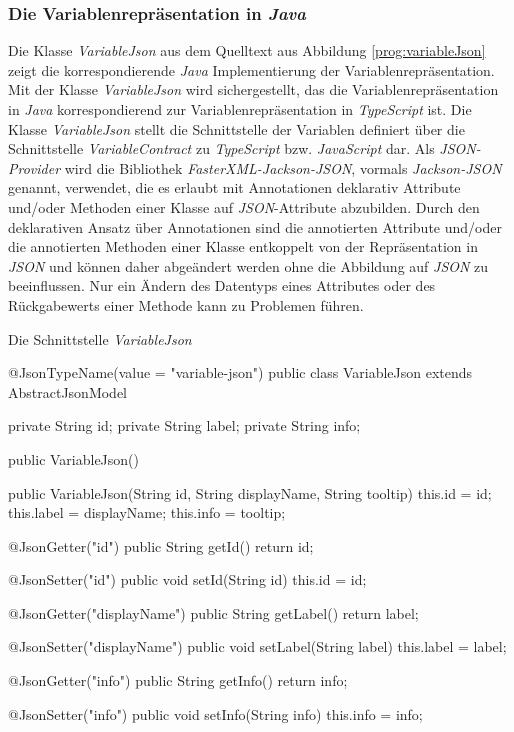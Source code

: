 \subsubsection{Die Variablenrepräsentation in \emph{Java}}
Die Klasse \emph{VariableJson} aus dem Quelltext aus Abbildung \ref{prog:variableJson} zeigt die korrespondierende \emph{Java} Implementierung der Variablenrepräsentation. Mit der Klasse \emph{VariableJson} wird sichergestellt, das die Variablenrepräsentation in \emph{Java} korrespondierend zur Variablenrepräsentation in \emph{TypeScript} ist. Die Klasse \emph{VariableJson} stellt die Schnittstelle der Variablen definiert über die Schnittstelle \emph{VariableContract} zu \emph{TypeScript} bzw. \emph{JavaScript} dar. Als \emph{JSON-Provider} wird die Bibliothek \emph{FasterXML-Jackson-JSON}, vormals \emph{Jackson-JSON} genannt, verwendet, die es erlaubt mit Annotationen deklarativ Attribute und/oder Methoden einer Klasse auf \emph{JSON}-Attribute abzubilden. Durch den deklarativen Ansatz über Annotationen sind die annotierten  Attribute und/oder die annotierten Methoden einer Klasse entkoppelt von der Repräsentation in \emph{JSON} und können daher abgeändert werden ohne die Abbildung auf \emph{JSON} zu beeinflussen. Nur ein Ändern des Datentyps eines Attributes oder des Rückgabewerts einer Methode kann zu Problemen führen. 
\newline
\begin{program}
\caption{Die Schnittstelle \emph{VariableJson}}
\label{prog:variableJson}
\begin{JsCode}
@JsonTypeName(value = "variable-json")
public class VariableJson extends AbstractJsonModel {

    private String id;
    private String label;
    private String info;

    public VariableJson() {
    }

    public VariableJson(String id, 
                        String displayName, 
                        String tooltip) {
        this.id = id;
        this.label = displayName;
        this.info = tooltip;
    }

    @JsonGetter("id")
    public String getId() { 
        return id; 
    }

    @JsonSetter("id")
    public void setId(String id) { 
        this.id = id; 
    }

    @JsonGetter("displayName")
    public String getLabel() { 
        return label; 
    }

    @JsonSetter("displayName")
    public void setLabel(String label) { 
        this.label = label; 
    }

    @JsonGetter("info")
    public String getInfo() { 
        return info; 
    }

    @JsonSetter("info")
    public void setInfo(String info) { 
        this.info = info; 
    }
}
\end{JsCode}
\end{program}
\ \newline


